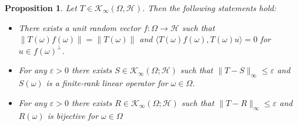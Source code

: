 \documentclass[pdflatex,sn-mathphys-num]{sn-jnl}%
\theoremstyle{thmstyleone}%
\newtheorem{proposition}[theorem]{Proposition}%
\theoremstyle{thmstyletwo}%
\theoremstyle{thmstylethree}%
\newcommand{\cH}{\mathcal{H}}
\newcommand{\cK}{\mathcal{K}}
\newcommand{\eps}{\varepsilon}
\numberwithin{equation}{section}
\begin{document}
\begin{proposition}\label{Completeness}
Let $T\in\cK_{\infty}(\Omega,\cH)$. Then the following statements hold:
\begin{itemize}
    \item [(i)] There exists a unit random vector $f:\Omega\rightarrow \cH$ such that $\|T(\omega)f(\omega)\|=\|T(\omega)\|$ and  $\langle T(\omega) f(\omega), T(\omega) u \rangle=0$ for $u\in f(\omega)^{\perp}$.
    \item [(ii)] For any $\eps>0$ there exists $S \in \mathcal K_{\infty}(\Omega;\mathcal H)$ such that $\|T-S\|_{\infty}\leq \eps$ and $S(\omega)$ is a finite-rank linear operator for $\omega\in\Omega $.
    \item [(iii)] For any $\eps>0$ there exists $R\in \mathcal K_{\infty}(\Omega;\mathcal H)$ such that $\|T-R\|_{\infty}\leq \eps$ and $R(\omega)$ is bijective for $\omega\in\Omega$
\end{itemize}
\end{proposition}
\end{document}
